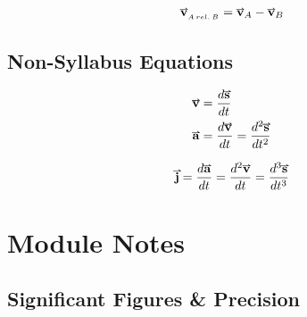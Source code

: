 \documentclass[main.tex]{subfiles}
\begin{document}
\begin{fleqn}
                \begin{align}
                    \vect{v}_{_{A\, rel.\, B}} = \vect{v}_A - \vect{v}_B
                    \label{eq: Velocity of A rel to B}
                \end{align}





                \subsection{Non-Syllabus Equations}
                    \label{subsec: Kinematics Non Syllabus Equations}

                    \begin{align}
                        \vect{v} &= \frac{d\vect{s}}{dt} \label{eq: Derivative Velocity Definition}\\
                        \vect{a} &= \frac{d\vect{v}}{dt} = \frac{d^2 \vect{s}}{dt^2} \label{eq: Derivative Acceleration Definition}
                    \end{align}


                    \begin{align}
                        \vect{j} = \frac{d\vect{a}}{dt} = \frac{d^2\vect{v}}{dt} = \frac{d^3\vect{s}}{dt^3}
                        \label{eq: Derivative Jerk Definition}
                    \end{align}

            \end{fleqn}
            

            \newpage

            \section{Module Notes}
                \label{sec: Kinematics Module Notes}

                \subsection{Significant Figures \& Precision}
                    \label{subsec: Significant Figures}
\end{document}
